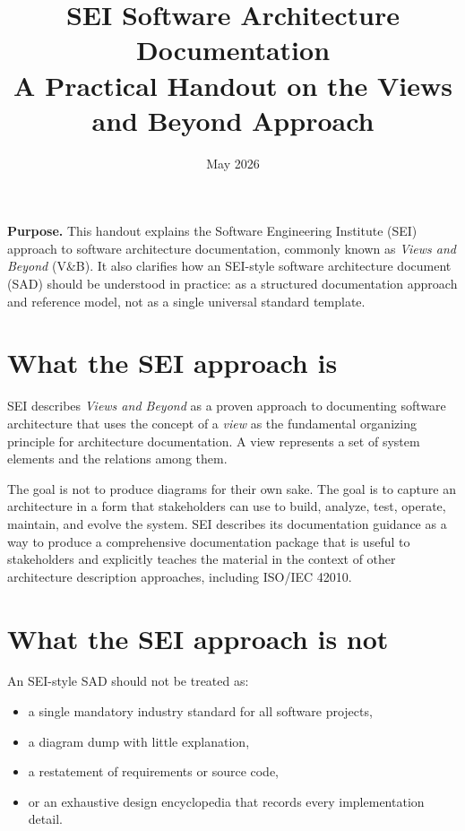 \documentclass[11pt]{article}
\title{SEI Software Architecture Documentation\\[4pt]
\large A Practical Handout on the Views and Beyond Approach}
\author{}
\date{May 2026}
\begin{document}
\maketitle
\thispagestyle{empty}

\textbf{Purpose.} This handout explains the Software Engineering Institute (SEI) approach to software architecture documentation, commonly known as \emph{Views and Beyond} (V\&B). It also clarifies how an SEI-style software architecture document (SAD) should be understood in practice: as a structured documentation approach and reference model, not as a single universal standard template.\cite{sei-vb-factsheet,sei-vb-collection,sei-ref-standard}

\section*{What the SEI approach is}

SEI describes \emph{Views and Beyond} as a proven approach to documenting software architecture that uses the concept of a \emph{view} as the fundamental organizing principle for architecture documentation. A view represents a set of system elements and the relations among them.\cite{sei-vb-factsheet}

The goal is not to produce diagrams for their own sake. The goal is to capture an architecture in a form that stakeholders can use to build, analyze, test, operate, maintain, and evolve the system. SEI describes its documentation guidance as a way to produce a comprehensive documentation package that is useful to stakeholders and explicitly teaches the material in the context of other architecture description approaches, including ISO/IEC 42010.\cite{sei-book-page,sei-course}

\section*{What the SEI approach is not}

An SEI-style SAD should not be treated as:

\begin{itemize}
    \item a single mandatory industry standard for all software projects,
    \item a diagram dump with little explanation,
    \item a restatement of requirements or source code,
    \item or an exhaustive design encyclopedia that records every implementation detail.
\end{itemize}
\end{document}
